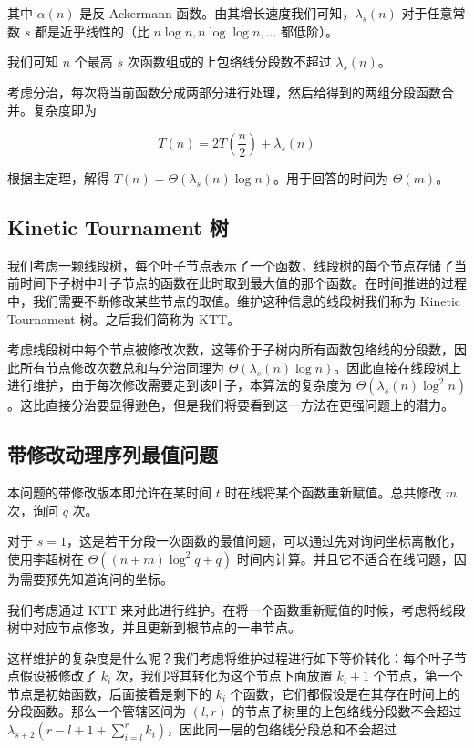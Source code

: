 \documentclass[12pt]{ctexart}
\begin{document}
其中 $\alpha(n)$ 是反 Ackermann 函数。由其增长速度我们可知，$\lambda_s(n)$ 对于任意常数 $s$ 都是近乎线性的（比 $n\log n, n\log\log n, \dots$ 都低阶）。

我们可知 $n$ 个最高 $s$ 次函数组成的上包络线分段数不超过 $\lambda_s(n)$。

考虑分治，每次将当前函数分成两部分进行处理，然后给得到的两组分段函数合并。复杂度即为

$$
T(n) = 2T \left(\frac n2\right) + \lambda_s (n)
$$

根据主定理，解得 $T(n) = \Theta(\lambda_s(n) \log n)$。用于回答的时间为 $\Theta(m)$。

\subsection{Kinetic Tournament 树}

我们考虑一颗线段树，每个叶子节点表示了一个函数，线段树的每个节点存储了当前时间下子树中叶子节点的函数在此时取到最大值的那个函数。在时间推进的过程中，我们需要不断修改某些节点的取值。维护这种信息的线段树我们称为 Kinetic Tournament 树。之后我们简称为 KTT。

考虑线段树中每个节点被修改次数，这等价于子树内所有函数包络线的分段数，因此所有节点修改次数总和与分治同理为 $\Theta(\lambda_s(n)\log n)$。因此直接在线段树上进行维护，由于每次修改需要走到该叶子，本算法的复杂度为 $\Theta(\lambda_s(n)\log^2 n)$。这比直接分治要显得逊色，但是我们将要看到这一方法在更强问题上的潜力。

\subsection{带修改动理序列最值问题}

本问题的带修改版本即允许在某时间 $t$ 时在线将某个函数重新赋值。总共修改 $m$ 次，询问 $q$ 次。

对于 $s = 1$，这是若干分段一次函数的最值问题，可以通过先对询问坐标离散化，使用李超树在 $\Theta((n + m)\log^2 q + q)$ 时间内计算。并且它不适合在线问题，因为需要预先知道询问的坐标。

我们考虑通过 KTT 来对此进行维护。在将一个函数重新赋值的时候，考虑将线段树中对应节点修改，并且更新到根节点的一串节点。

这样维护的复杂度是什么呢？我们考虑将维护过程进行如下等价转化：每个叶子节点假设被修改了 $k_i$ 次，我们将其转化为这个节点下面放置 $k_i + 1$ 个节点，第一个节点是初始函数，后面接着是剩下的 $k_i$ 个函数，它们都假设是在其存在时间上的分段函数。那么一个管辖区间为 $(l, r)$ 的节点子树里的上包络线分段数不会超过 $\lambda_{s + 2}(r - l + 1 + \sum_{i=l}^r k_i)$，因此同一层的包络线分段总和不会超过
\end{document}
